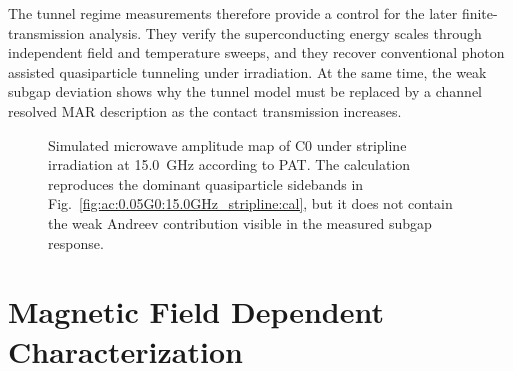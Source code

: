         The tunnel regime measurements therefore provide a control for the later finite-transmission analysis. They verify the superconducting energy scales through independent field and temperature sweeps, and they recover conventional photon assisted quasiparticle tunneling under irradiation. At the same time, the weak subgap deviation shows why the tunnel model must be replaced by a channel resolved MAR description as the contact transmission increases.


        \begin{figure}[p]
            \centering
            \caption{
                Calibrated microwave amplitude map of C0 under stripline irradiation at \qty{15.0}{\giga\hertz}. Photon assisted replicas emerge from the quasiparticle onset and redistribute spectral weight as $eA/h\nu$ increases. A weaker subgap feature near $\lvert eV\rvert=\Delta$ indicates the onset of Andreev reflection.
                }
            \label{fig:ac:0.05G0:15.0GHz_stripline:cal}

            \vspace{1em}

            \caption{
                Simulated microwave amplitude map of C0 under stripline irradiation at \qty{15.0}{\giga\hertz} according to PAT. The calculation reproduces the dominant quasiparticle sidebands in Fig.~\ref{fig:ac:0.05G0:15.0GHz_stripline:cal}, but it does not contain the weak Andreev contribution visible in the measured subgap response.
                }
            \label{fig:ac:0.05G0:15.0GHz_stripline:sim}
        \end{figure}


    \clearpage
    \section{Magnetic Field Dependent Characterization}
    \label{sec:appendix:ac:magnetic-field}


